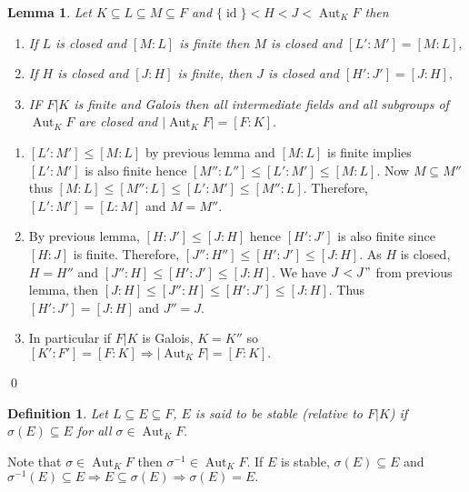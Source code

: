 \documentclass[11pt]{amsart}
\newtheorem{defn}[theorem]{Definition}
\newtheorem{lemma}[theorem]{Lemma}%
\DeclareMathOperator{\aut}{\text{Aut}}
\DeclareMathOperator{\id}{\text{id}}
\begin{document}
\begin{lemma}
Let $K\subseteq L\subseteq M\subseteq F$ and $\{\id\}<H<J<\aut_KF$ then \begin{enumerate}
\item If $L$ is closed and $[M:L]$ is finite then $M$ is closed and $[L':M']=[M:L],$
\item If $H$ is closed and $[J:H]$ is finite, then $J$ is closed and $[H':J']=[J:H],$
\item IF $F|K$ is finite and Galois then all intermediate fields and all subgroups of $\aut_KF$ are closed and $|\aut_KF|=[F:K].$
\end{enumerate}
\end{lemma}
\proof \begin{enumerate}
\item $[L':M']\leq [M:L]$ by previous lemma and $[M:L]$ is finite implies $[L':M']$ is also finite hence $[M'':L'']\leq [L':M']\leq [M:L]$. Now $M\subseteq M''$ thus $[M:L]\leq [M'':L]\leq [L':M']\leq [M'':L]$. Therefore, $[L':M']=[L:M]$ and $M=M''.$
\item By previous lemma, $[H:J']\leq [J:H]$ hence $[H':J']$ is also finite since $[H:J]$ is finite. Therefore, $[J'':H'']\leq [H':J']\leq [J:H]$. As $H$ is closed, $H=H''$ and $[J'':H]\leq [H':J']\leq [J:H].$ We have $J<J"$ from previous lemma, then $[J:H]\leq [J'':H]\leq [H':J']\leq [J:H]$. Thus $[H':J']=[J:H]$ and $J''=J.$
\item In particular if $F|K$ is Galois, $K=K''$ so $[K':F']=[F:K] \Rightarrow |\aut_KF|=[F:K].$
\end{enumerate}
\qed


\begin{defn}
Let $L\subseteq E\subseteq F$, $E$ is said to be stable (relative to $F|K$) if $\sigma(E)\subseteq E$ for all $\sigma\in\aut_KF.$
\end{defn}
Note that $\sigma\in\aut_KF$ then $\sigma^{-1}\in \aut_KF$. If $E$ is stable, $\sigma(E)\subseteq E$ and $\sigma^{-1}(E)\subseteq E \Rightarrow E\subseteq \sigma(E) \Rightarrow \sigma(E)=E.$
\end{document}
